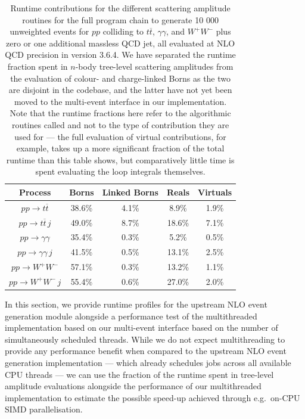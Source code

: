 \documentclass[a4paper,11pt]{article}
\begin{document}
\begin{table}[t]
    \centering
    \begin{tabular}{c|c|c|c|c}
         Process & Borns & Linked Borns & Reals & Virtuals  \\ \hline
         $pp \to t \overline{t} $& 38.6\% & 4.1\% & 8.9\% & 1.9\%\\ 
         $pp \to t \overline{t} \,j$ & 49.0\% & 8.7\% & 18.6\% & 7.1\% \\  \hline 
         $pp \to \gamma\gamma$ & 35.4\% & 0.3\% & 5.2\% & 0.5\%  \\
         $pp \to \gamma\gamma \, j$  & 41.5\% & 0.5\% & 13.1\% & 2.5\% \\ \hline 
         $pp \to W^+ W^- $& 57.1\% & 0.3\% & 13.2\% & 1.1\% \\ 
         $pp \to W^+ W^- \, j$ & 55.4\% & 0.6\% & 27.0\% & 2.0\% \\ 
    \end{tabular}
    \caption{Runtime contributions for the different scattering amplitude routines for the full program chain to generate 10 000 unweighted events for $pp$ colliding to $t\overline{t}$, $\gamma\gamma$, and $W^+ W^-$ plus zero or one additional massless QCD jet, all evaluated at NLO QCD precision in \mg{} version 3.6.4. We have separated the runtime fraction spent in $n$-body tree-level scattering amplitudes from the evaluation of colour- and charge-linked Borns as the two are disjoint in the codebase, and the latter have not yet been moved to the multi-event interface in our implementation. Note that the runtime fractions here refer to the algorithmic routines called and not to the type of contribution they are used for --- the full evaluation of virtual contributions, for example, takes up a more significant fraction of the total runtime than this table shows, but comparatively little time is spent evaluating the loop integrals themselves.}
    \label{tab:nlo_runtime_fractions}
\end{table}

In this section, we provide runtime profiles for the upstream \mg{} NLO event generation module alongside a performance test of the multithreaded implementation based on our multi-event interface based on the number of simultaneously scheduled threads. While we do not expect multithreading to provide any performance benefit when compared to the upstream \mg{} NLO event generation implementation --- which already schedules jobs across all available CPU threads --- we can use the fraction of the runtime spent in tree-level amplitude evaluations alongside the performance of our multithreaded implementation to estimate the possible speed-up achieved through e.g.\ on-CPU SIMD parallelisation.
\end{document}
